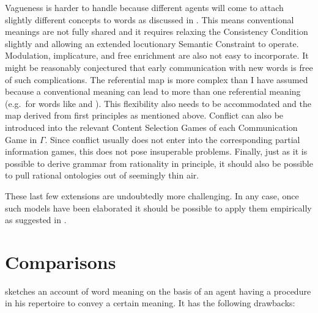 Vagueness is harder to handle because different agents will come to attach slightly different concepts to words as discussed in . This means conventional meanings are not fully shared and it requires relaxing the Consistency Condition slightly and allowing an extended locutionary Semantic Constraint to operate. Modulation, implicature, and free enrichment are also not easy to incorporate. It might be reasonably conjectured that early communication with new words is free of such complications. The referential map is more complex than I have assumed because a conventional meaning can lead to more than one referential meaning (e.g.\ for words like  and ). This flexibility also needs to be accommodated and the map derived from first principles as mentioned above. Conflict can also be introduced into the relevant Content Selection Games of each Communication Game in $\Gamma$. Since conflict usually does not enter into the corresponding partial information games, this does not pose insuperable problems. Finally, just as it is possible to derive grammar from rationality in principle, it should also be possible to pull rational ontologies out of seemingly thin air.

These last few extensions are undoubtedly more challenging. In any case, once such models have been elaborated it should be possible to apply them empirically as suggested in .


\section{Comparisons}\label{sec:comparisons}

\citet{grice:umsmwm} sketches an account of word meaning on the basis of an agent having a procedure in his repertoire to convey a certain meaning. It has the following drawbacks:

